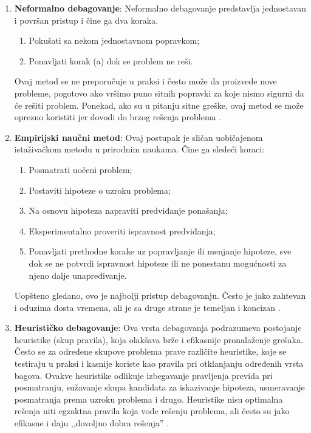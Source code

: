 \documentclass[a4paper]{article}
\begin{document}
\begin{enumerate}
\item \textbf{Neformalno debagovanje}: Neformalno debagovanje predstavlja jednostavan i površan pristup i čine ga dva koraka.
  \begin{enumerate}
  \item Pokušati sa nekom jednostavnom popravkom;
  \item Ponavljati korak (a) dok se problem ne reši.
  \end{enumerate}
  Ovaj metod se ne preporučuje u praksi i često može da proizvede nove probleme, pogotovo ako vršimo puno sitnih popravki za koje nismo sigurni da će rešiti problem. Ponekad, ako su u pitanju sitne greške, ovaj metod se može oprezno koristiti jer dovodi do brzog rešenja problema \cite{bagovi_smalkov}.
  
\item \textbf{Empirijski naučni metod}:
  Ovaj postupak je sličan uobičajenom istaživačkom metodu u prirodnim naukama.
  Čine ga sledeći koraci:
  \begin{enumerate}
  \item Posmatrati uočeni problem;
  \item Postaviti hipoteze o uzroku problema;
  \item Na osnovu hipoteza napraviti predviđanje ponašanja;
  \item Eksperimentalno proveriti ispravnost predviđanja;
  \item Ponavljati prethodne korake uz popravljanje ili menjanje hipoteze, sve dok se ne potvrdi ispravnost hipoteze ili ne ponestanu mogućnosti za njeno dalje unapređivanje.
  \end{enumerate}
  \indent Uopšteno gledano, ovo je najbolji pristup debagovanju. Često je jako zahtevan i oduzima dosta vremena, ali je sa druge strane je temeljan i koncizan \cite{bagovi_smalkov}.
  
  
\item \textbf{Heurističko debagovanje}: Ova vrsta debagovanja podrazumeva postojanje heuristike (skup pravila), koja olakšava brže i efikasnije pronalaženje grešaka. Često se za određene skupove problema prave različite heuristike, koje se testiraju u praksi i kasnije koriste kao pravila pri otklanjanju određenih vrsta bagova. Ovakve heuristike odlikuje izbegavanje pravljenja previda pri posmatranju, sužavanje skupa kandidata za iskazivanje hipoteza, usmeravanje posmatranja prema uzroku problema i drugo. Heuristike nisu optimalna rešenja niti egzaktna pravila koja vode rešenju problema, ali često su jako efikasne i daju ,,dovoljno dobra rešenja'' \cite{bagovi_smalkov}.
\end{enumerate}
\end{document}
